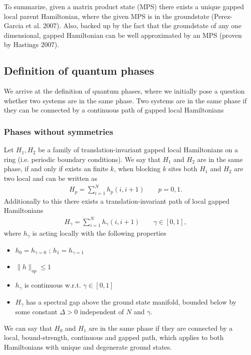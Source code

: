 To summarize, given a matrix product state (MPS) there exists a unique gapped
local parent Hamiltonian, where the given MPS is in the groundstate
(Perez-Garcia et al. 2007). Also, backed up by the fact that the groundstate
of any one dimensional, gapped Hamiltonian can be well approximated by an MPS
(proven by Hastings 2007).
\subsection{Definition of quantum phases}
We arrive at the definition of quantum phases, where we initially pose a
question whether two systems are in the same phase. Two systems are in the
same phase if they can be connected by a continuous path of gapped local
Hamiltonians
\subsubsection{Phases without symmetries}
Let $H_1, H_2$ be a family of translation-invariant gapped local Hamiltonians
on a ring (i.e. periodic boundary conditions). We say that $H_1$ and $H_2$
are in the same phase, if and only if exists an finite $k$, when blocking $k$
sites both $H_1$ and $H_2$ are two local and can be written as
\begin{align}
    H_p = \sum_{i=1}^{N} h_p(i,i+1) \qquad p=0,1.
\end{align}
Additionally to this there exists a translation-invariant path of local
gapped Hamiltonians
\begin{align}
    H_\gamma = \sum_{i=1}^{N} h_\gamma(i,i+1) \qquad \gamma \in [0, 1],
\end{align}
where $h_\gamma$ is acting locally with the following properties
\begin{itemize}
    \item $h_0 = h_{\gamma=0}$ ; $h_1 = h_{\gamma=1}$
    \item $\|h\|_{op} \le 1$
    \item $h_\gamma$ is continuous w.r.t. $\gamma \in [0, 1]$
    \item $H_\gamma$ has a spectral gap above the ground state manifold,
        bounded below by  some constant $\Delta >0$ independent of $N$ and
        $\gamma$.
\end{itemize}
We can say that $H_0$ and $H_1$ are in the same phase if they are connected
by a local, bound-strength, continuous and gapped path, which applies to both
Hamiltonians with unique and degenerate ground states.
